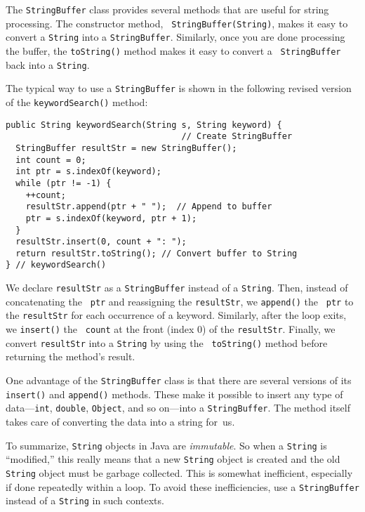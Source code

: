 
\noindent The {\tt StringBuffer} class provides several methods that are useful
for string processing. The constructor method, {\tt
StringBuffer(String)}, makes it easy to convert a {\tt String} into a
{\tt StringBuffer}. Similarly, once you are done processing the
buffer, the {\tt toString()} method makes it easy to convert a {\tt
StringBuffer} back into a {\tt String}.

The typical way to use a {\tt StringBuffer} is shown in the following
revised version of the {\tt keywordSearch()} method:

\begin{jjjlisting}
\begin{lstlisting}
public String keywordSearch(String s, String keyword) {
                                   // Create StringBuffer
  StringBuffer resultStr = new StringBuffer(); 
  int count = 0;
  int ptr = s.indexOf(keyword);
  while (ptr != -1) {
    ++count;
    resultStr.append(ptr + " ");  // Append to buffer
    ptr = s.indexOf(keyword, ptr + 1);
  }
  resultStr.insert(0, count + ": ");
  return resultStr.toString(); // Convert buffer to String
} // keywordSearch()
\end{lstlisting}
\end{jjjlisting}

\noindent We declare {\tt resultStr} as a {\tt StringBuffer}
instead of a {\tt String}. Then, instead of concatenating the {\tt
ptr} and reassigning the {\tt resultStr}, we {\tt append()} the {\tt
ptr} to the {\tt resultStr} for each occurrence of a
keyword. Similarly, after the loop exits, we {\tt insert()} the {\tt
count} at the front (index 0) of the {\tt resultStr}. Finally, we
convert {\tt resultStr} into a {\tt String} by using the {\tt
toString()} method before returning the method's result.

One advantage of the {\tt StringBuffer} class is that there are several
versions of its {\tt insert()} and {\tt append()} methods.  These make
it possible to insert any type of data---{\tt int}, {\tt double},
{\tt Object}, and so on---into a {\tt StringBuffer}. The method itself
takes care of converting the data into a string for~us.


To summarize, {\tt String} objects in Java are {\it immutable}. So
when a {\tt String} is ``modified,'' this really means that a new {\tt String}
object is created and the old {\tt String} object must be garbage collected.
This is somewhat inefficient, especially if done repeatedly within a loop.
To avoid these inefficiencies, use a {\tt StringBuffer} instead of a {\tt String}
in such contexts.


